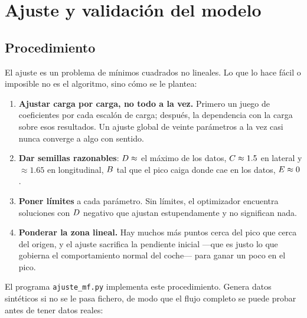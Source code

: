 \section{Ajuste y validación del modelo}
\label{sec:modelado_neumatico:04}

\subsection{Procedimiento}

El ajuste es un problema de mínimos cuadrados no lineales. Lo que lo hace fácil o
imposible no es el algoritmo, sino cómo se le plantea:

\begin{enumerate}
  \item \textbf{Ajustar carga por carga, no todo a la vez.} Primero un juego de
        coeficientes por cada escalón de carga; después, la dependencia con la
        carga sobre esos resultados. Un ajuste global de veinte parámetros a la
        vez casi nunca converge a algo con sentido.
  \item \textbf{Dar semillas razonables}: $D \approx$ el máximo de los datos,
        $C \approx \num{1.5}$ en lateral y $\approx \num{1.65}$ en
        longitudinal, $B$ tal que el pico caiga donde cae en los datos,
        $E \approx 0$.
  \item \textbf{Poner límites} a cada parámetro. Sin límites, el optimizador
        encuentra soluciones con $D$ negativo que ajustan estupendamente y no
        significan nada.
  \item \textbf{Ponderar la zona lineal.} Hay muchos más puntos cerca del pico
        que cerca del origen, y el ajuste sacrifica la pendiente inicial ---que
        es justo lo que gobierna el comportamiento normal del coche--- para ganar
        un poco en el pico.
\end{enumerate}

El programa \texttt{ajuste\_mf.py} implementa este procedimiento. Genera datos
sintéticos si no se le pasa fichero, de modo que el flujo completo se puede
probar antes de tener datos reales:





